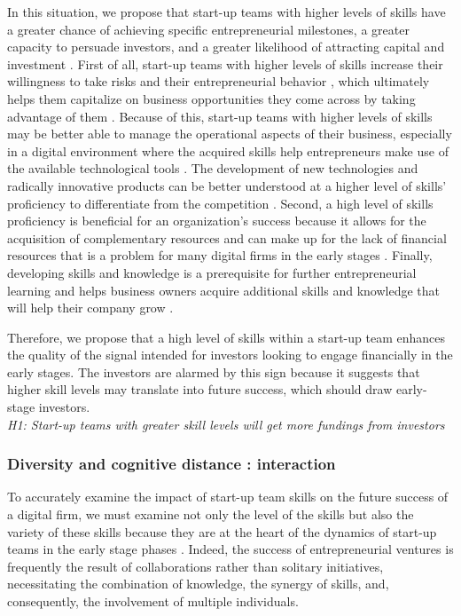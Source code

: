 \documentclass[12pt]{article}
\begin{document}
In this situation, we propose that start-up teams with higher levels of skills have a greater chance of achieving specific entrepreneurial milestones, a greater capacity to persuade investors, and a greater likelihood of attracting capital and investment \citep{zarutskie2010role}. First of all, start-up teams with higher levels of skills increase their willingness to take risks and their entrepreneurial behavior \citep{becherer1999proactive}, which ultimately helps them capitalize on business opportunities they come across by taking advantage of them \citep{shane2000promise, chandler1994founder}. Because of this, start-up teams with higher levels of skills may be better able to manage the operational aspects of their business, especially in a digital environment where the acquired skills help entrepreneurs make use of the available technological tools \citep{nambisan2017digital}. The development of new technologies and radically innovative products can be better understood at a higher level of skills' proficiency to differentiate from the competition \citep{marvel2007technology}. Second, a high level of skills proficiency is beneficial for an organization's success because it allows for the acquisition of complementary resources and can make up for the lack of financial resources that is a problem for many digital firms in the early stages \citep{beckman2007early}. Finally, developing skills and knowledge is a prerequisite for further entrepreneurial learning and helps business owners acquire additional skills and knowledge that will help their company grow \citep{hunter1986cognitive}.

Therefore, we propose that a high level of skills within a start-up team enhances the quality of the signal intended for investors looking to engage financially in the early stages. The investors are alarmed by this sign because it suggests that higher skill levels may translate into future success, which should draw early-stage investors. \\

\noindent \textit{H1: Start-up teams with greater skill levels will get more fundings from investors} \\

\subsubsection{Diversity and cognitive distance : interaction}

To accurately examine the impact of start-up team skills on the future success of a digital firm, we must examine not only the level of the skills but also the variety of these skills because they are at the heart of the dynamics of start-up teams in the early stage phases \citep{grillitsch2021does}. Indeed, the success of entrepreneurial ventures is frequently the result of collaborations rather than solitary initiatives, necessitating the combination of knowledge, the synergy of skills, and, consequently, the involvement of multiple individuals.
\end{document}
